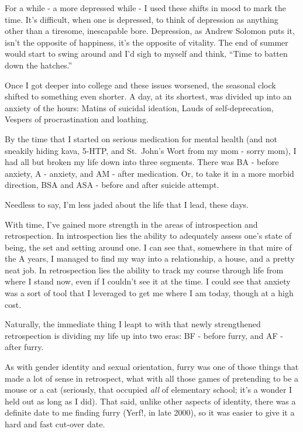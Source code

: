 For a while - a more depressed while - I used these shifts in mood to
mark the time. It's difficult, when one is depressed, to think of
depression as anything other than a tiresome, inescapable bore.
Depression, as Andrew Solomon puts it, isn't the opposite of happiness,
it's the opposite of vitality. The end of summer would start to swing
around and I'd sigh to myself and think, ``Time to batten down the
hatches.''

Once I got deeper into college and these issues worsened, the seasonal
clock shifted to something even shorter. A day, at its shortest, was
divided up into an anxiety of the hours: Matins of suicidal ideation,
Lauds of self-deprecation, Vespers of procrastination and loathing.

By the time that I started on serious medication for mental health (and
not sneakily hiding kava, 5-HTP, and St.~John's Wort from my mom - sorry
mom), I had all but broken my life down into three segments. There was
BA - before anxiety, A - anxiety, and AM - after medication. Or, to take
it in a more morbid direction, BSA and ASA - before and after suicide
attempt.

Needless to say, I'm less jaded about the life that I lead, these days.

With time, I've gained more strength in the areas of introspection and
retrospection. In introspection lies the ability to adequately assess
one's state of being, the set and setting around one. I can see that,
somewhere in that mire of the A years, I managed to find my way into a
relationship, a house, and a pretty neat job. In retrospection lies the
ability to track my course through life from where I stand now, even if
I couldn't see it at the time. I could see that anxiety was a sort of
tool that I leveraged to get me where I am today, though at a high cost.

Naturally, the immediate thing I leapt to with that newly strengthened
retrospection is dividing my life up into two eras: BF - before furry,
and AF - after furry.

As with gender identity and sexual orientation, furry was one of those
things that made a lot of sense in retrospect, what with all those games
of pretending to be a mouse or a cat (seriously, that occupied
\emph{all} of elementary school; it's a wonder I held out as long as I
did). That said, unlike other aspects of identity, there was a definite
date to me finding furry (Yerf!, in late 2000), so it was easier to give
it a hard and fast cut-over date.

